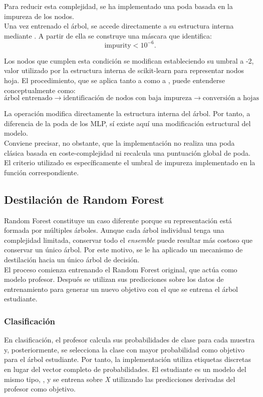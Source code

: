 \documentclass[a4paper,12pt,twoside,final]{book}
\begin{document}
Para reducir esta complejidad, se ha implementado una poda basada en la impureza de los nodos.\\

Una vez entrenado el árbol, se accede directamente a su estructura interna mediante . A partir de
ella se construye una máscara que identifica:
\[
\text{impurity} < 10^{-6}\text{.}
\]

Los nodos que cumplen esta condición se modifican estableciendo su umbral a -2, valor utilizado por la estructura
interna de scikit-learn para representar nodos hoja. El procedimiento, que se aplica tanto a
 como a , puede entenderse conceptualmente como:
\[
\text{árbol entrenado} \rightarrow \text{identificación de nodos con baja impureza} \rightarrow \text{conversión a hojas}
\]

La operación modifica directamente la estructura interna del árbol. Por tanto, a diferencia de la poda de los MLP, sí
existe aquí una modificación estructural del modelo.\\

Conviene precisar, no obstante, que la implementación no realiza una poda clásica basada en coste-complejidad ni
recalcula una puntuación global de poda. El criterio utilizado es específicamente el umbral de impureza implementado en
la función correspondiente.

\subsection{Destilación de Random Forest}
Random Forest constituye un caso diferente porque su representación está formada por múltiples árboles. Aunque cada
árbol individual tenga una complejidad limitada, conservar todo el \textit{ensemble} puede resultar más costoso que
conservar un único árbol. Por este motivo, se le ha aplicado un mecanismo de destilación hacia un único árbol de
decisión.\\

El proceso comienza entrenando el Random Forest original, que actúa como modelo profesor. Después se utilizan sus
predicciones sobre los datos de entrenamiento para generar un nuevo objetivo con el que se entrena el árbol estudiante.

\subsubsection{Clasificación}
En clasificación, el profesor calcula sus probabilidades de clase para cada muestra y, posteriormente, se selecciona la
clase con mayor probabilidad como objetivo para el árbol estudiante. Por tanto, la implementación utiliza etiquetas
discretas en lugar del vector completo de probabilidades. El estudiante es un modelo del mismo tipo,
, y se entrena sobre \textit{X} utilizando las predicciones derivadas del profesor como
objetivo.\\
\end{document}
